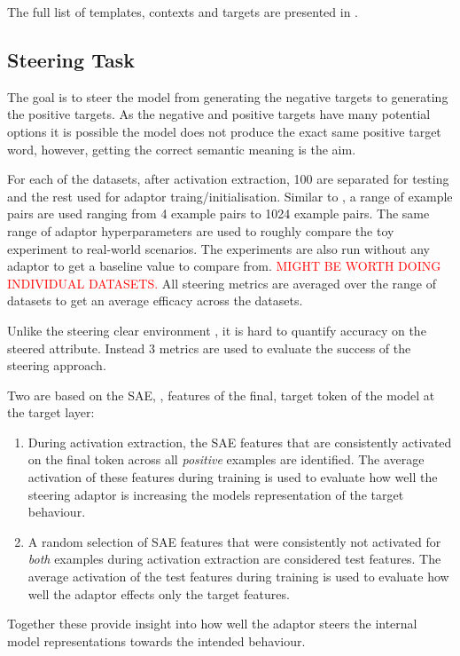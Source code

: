 The full list of templates, contexts and targets are presented in .

\subsection{Steering Task}

The goal is to steer the model from generating the negative targets to generating the positive targets.
As the negative and positive targets have many potential options it is possible the model does not produce the exact same positive target word, however, getting the correct semantic meaning is the aim.

For each of the datasets, after activation extraction, 100 are separated for testing and the rest used for adaptor traing/initialisation.
Similar to \citep{steering-clear}, a range of example pairs are used ranging from 4 example pairs to 1024 example pairs.
The same range of adaptor hyperparameters are used to roughly compare the toy experiment to real-world scenarios.
The experiments are also run without any adaptor to get a baseline value to compare from.
\textcolor{red}{MIGHT BE WORTH DOING INDIVIDUAL DATASETS.}
All steering metrics are averaged over the range of datasets to get an average efficacy across the datasets.

 Unlike the steering clear environment , it is hard to quantify accuracy on the steered attribute.
Instead 3 metrics are used to evaluate the success of the steering approach.

Two are based on the SAE, , features of the final, target token of the model at the target layer:
\begin{enumerate}[nolistsep]
    \item During activation extraction, the SAE features that are consistently activated on the final token across all \emph{positive} examples are identified.
        The average activation of these features during training is used to evaluate how well the steering adaptor is increasing the models representation of the target behaviour.
    \item A random selection of SAE features that were consistently not activated for \emph{both} examples during activation extraction are considered test features.
        The average activation of the test features during training is used to evaluate how well the adaptor effects only the target features.
\end{enumerate}
Together these provide insight into how well the adaptor steers the internal model representations towards the intended behaviour.


